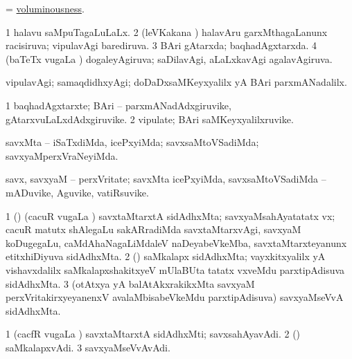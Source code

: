 \bentry
{} 
\gl{\nA}
\expl{}
\bmng
 = \hyperlink{voluminousness}{voluminousness}. 
\emng
\eentry

\bentry
{} 
\gl{\gu}
\expl{}
\bmng
\bnum
\num{1} halavu saMpuTagaLuLaLx. 
\num{2} (leVKakana \vi) halavAru garxMthagaLanunx racisiruva; vipulavAgi barediruva. 
\num{3} BAri gAtarxda; baqhadAgxtarxda. 
\num{4} (baTeTx \mo vugaLa \vi) dogaleyAgiruva; saDilavAgi, aLaLxkavAgi agalavAgiruva. 
\enum
\emng
\eentry

\bentry
{} 
\gl{\kirxvi}
\expl{}
\bmng
vipulavAgi; samaqdidhxyAgi; doDaDxsaMKeyxyalilx yA BAri parxmANadalilx. 
\emng
\eentry

\bentry 
{} 
\gl{\nA}
\expl{}
\bmng
\bnum
\num{1} baqhadAgxtarxte; BAri -- parxmANadAdxgiruvike, gAtarxvuLaLxdAdxgiruvike. 
\num{2} vipulate; BAri saMKeyxyalilxruvike. 
\enum
\emng
\eentry

\bentry
{} 
\gl{\kirxvi}
\expl{}
\bmng
 savxMta -- iSaTxdiMda, icePxyiMda; savxsaMtoVSadiMda; savxyaMperxVraNeyiMda. 
\emng
\eentry

\bentry
{} 
\gl{\nA}
\expl{}
\bmng
 savx, savxyaM -- perxVritate; savxMta icePxyiMda, savxsaMtoVSadiMda -- mADuvike, Aguvike, vatiRsuvike. 
\emng
\eentry

\bentry 
{} 
\gl{\nA}
\expl{}
\bmng
\hypertarget{voluntarism(1)}{} 
\bnum
\num{1} (\ca) (cacuR \mo vugaLa \vi) savxtaMtarxtA sidAdhxMta; savxyaMsahAyatatatx vx; cacuR matutx shAlegaLu sakARradiMda savxtaMtarxvAgi, savxyaM koDugegaLu, caMdAhaNagaLiMdaleV naDeyabeVkeMba, savxtaMtarxteyanunx etitxhiDiyuva sidAdhxMta. 
\num{2} (\tashA) saMkalapx sidAdhxMta; vayxkitxyalilx yA vishavxdalilx saMkalapxshakitxyeV mUlaBUta tatatx vxveMdu parxtipAdisuva sidAdhxMta. 
\num{3} (otAtxya yA balAtAkxrakikxMta savxyaM perxVritakirxyeyanenxV avalaMbisabeVkeMdu parxtipAdisuva) savxyaMseVvA sidAdhxMta. 
\enum
\emng
\eentry

\bentry
{} 
\gl{\nA}
\expl{}
\bmng
\bnum
\num{1} (cacfR \mo vugaLa \vi) savxtaMtarxtA sidAdhxMti; savxsahAyavAdi. 
\num{2} (\tashA) saMkalapxvAdi. 
\num{3} savxyaMseVvAvAdi. 
\enum
\emng
\eentry

